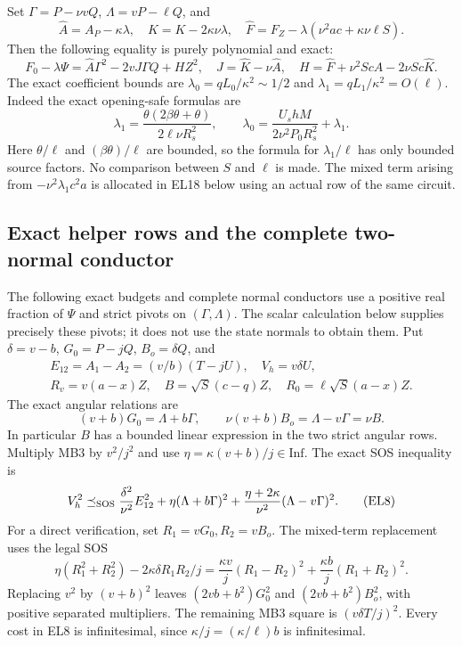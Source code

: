 Set $\Gamma=P-\nu vQ$, $\Lambda=vP-\ell Q$, and
\[
 \widehat A=A_P-\kappa\lambda,\quad
 \widehat K=K-2\kappa\nu\lambda,\quad
 \widehat F=F_Z-\lambda(\nu^2ac+\kappa\nu\ell S).
\]
Then the following equality is purely polynomial and exact:
\[
 F_0-\lambda\Psi
   =\widehat A\Gamma^2-2vJ\Gamma Q+HZ^2,
 \quad J=\widehat K-\nu\widehat A,
 \quad H=\widehat F+\nu^2Sc\widehat A-2\nu Sc\widehat K.
                                                               \tag{EL5}
\]
The exact coefficient bounds are
$\lambda_0=qL_0/\kappa^2\sim1/2$ and
$\lambda_1=qL_1/\kappa^2=O(\ell)$.
Indeed the exact opening-safe formulas are
\[
 \lambda_1=\frac{\theta(2\beta\theta+\theta)}
                    {2\ell\nu R_s^2},\qquad
 \lambda_0=\frac{U_shM}{2\nu^2P_0R_s^2}+\lambda_1.
\]
Here $\theta/\ell$ and $(\beta\theta)/\ell$ are bounded, so
the formula for $\lambda_1/\ell$ has only bounded source factors.
No comparison between $S$ and $\ell$ is made.  The mixed term
arising from $-\nu^2\lambda_1c^2a$ is allocated in EL18 below
using an actual row of the same circuit.

\subsection{Exact helper rows and the complete two-normal conductor}
The following exact budgets and complete normal conductors use a
positive real fraction of $\Psi$ and strict pivots on
$(\Gamma,\Lambda)$.  The scalar calculation below supplies precisely
these pivots; it does not use the state normals to obtain them.
Put $\delta=v-b$, $G_0=P-jQ$, $B_o=\delta Q$, and
\[
\begin{gathered}
 E_{12}=A_1-A_2=(v/b)(T-jU),\quad V_h=v\delta U,\\
 R_v=v(a-x)Z,\quad B=\sqrt S(c-q)Z,\quad
 R_0=\ell\sqrt S(a-x)Z.
\end{gathered}
                                                               \tag{EL6}
\]
The exact angular relations are
\[
 (v+b)G_0=\Lambda+b\Gamma,\qquad
 \nu(v+b)B_o=\Lambda-v\Gamma=\nu B.             \tag{EL7}
\]
In particular $B$ has a bounded linear expression in the two strict
angular rows.  Multiply MB3 by $v^2/j^2$ and use
$\eta=\kappa(v+b)/j\in\mathrm{Inf}$.  The exact SOS inequality is
\[
 V_h^2\preceq_{\rm SOS}
  \frac{\delta^2}{\nu^2}E_{12}^2
   +\eta(\Lambda+b\Gamma)^2
   +\frac{\eta+2\kappa}{\nu^2}(\Lambda-v\Gamma)^2.
                                                               \tag{EL8}
\]
For a direct verification, set $R_1=vG_0,R_2=vB_o$.
The mixed-term replacement uses the legal SOS
\[
 \eta(R_1^2+R_2^2)-2\kappa\delta R_1R_2/j
 =\frac{\kappa v}{j}(R_1-R_2)^2
  +\frac{\kappa b}{j}(R_1+R_2)^2.
\]
Replacing $v^2$ by $(v+b)^2$ leaves
$(2vb+b^2)G_0^2$ and $(2vb+b^2)B_o^2$, with positive
separated multipliers.  The remaining MB3 square is
$(v\delta T/j)^2$.  Every cost in EL8 is infinitesimal, since
$\kappa/j=(\kappa/\ell)b$ is infinitesimal.

